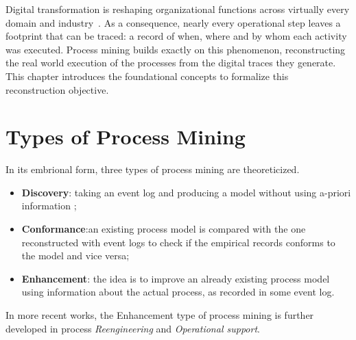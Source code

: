 Digital transformation is reshaping organizational functions across virtually every domain and industry~\cite{verhoef2021digitaltransformation}. As a consequence, nearly every operational step leaves a footprint that can be traced: a record of when, where and by whom each activity was executed.
Process mining builds exactly on this phenomenon, reconstructing the real world execution of the processes from the digital traces they generate.~\cite{aalst2011manifesto} \\
This chapter introduces the foundational concepts to formalize this reconstruction objective. 

\section{Types of Process Mining} 
In its embrional form, three types of process mining are theoreticized. 
	\begin{itemize}[leftmargin=*]
		\item \textbf{Discovery}: taking an event log and producing a model without using a-priori information ;
		\item \textbf{Conformance}:an existing process model is compared with the one reconstructed with event logs to check if the empirical records conforms to the model and vice versa;
		\item \textbf{Enhancement}: the idea is to improve an already existing process model using information about the actual process, as recorded in some event log.
	\end{itemize}
	In more recent works, the Enhancement type of process mining is further developed in process \emph{Reengineering} and \emph{Operational support}.
	




